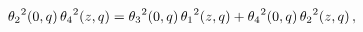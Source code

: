 \[{\mathop{\theta_{2}\/}\nolimits^{2}}\!\left(0,q\right){\mathop{\theta_{4}\/}%
\nolimits^{2}}\!\left(z,q\right)={\mathop{\theta_{3}\/}\nolimits^{2}}\!\left(0%
,q\right){\mathop{\theta_{1}\/}\nolimits^{2}}\!\left(z,q\right)+{\mathop{%
\theta_{4}\/}\nolimits^{2}}\!\left(0,q\right){\mathop{\theta_{2}\/}\nolimits^{%
2}}\!\left(z,q\right),\]